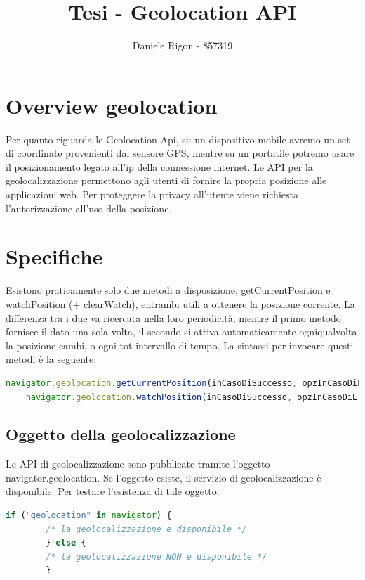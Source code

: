 \documentclass[italian]{article}
\author{
	Daniele Rigon - 857319 \\
}
\begin{document}
	
	\title{Tesi - Geolocation API}
	\maketitle
	
	\tableofcontents
	\pagebreak
	
	
	\section{Overview geolocation}
	Per quanto riguarda le Geolocation Api, su un dispositivo mobile avremo un set di coordinate provenienti dal sensore GPS, mentre su un portatile potremo usare il posizionamento legato all’ip della connessione internet.
	Le API per la geolocalizzazione permettono agli utenti di fornire la propria posizione alle applicazioni web. Per proteggere la privacy all'utente viene richiesta l'autorizzazione all'uso della posizione.
	
	\section{Specifiche}
	Esistono praticamente solo due metodi a disposizione, getCurrentPosition e watchPosition (+ clearWatch), entrambi utili a ottenere la posizione corrente. 
	La differenza tra i due va ricercata nella loro periodicità, mentre il primo metodo fornisce il dato una sola volta, il secondo si attiva automaticamente ogniqualvolta la posizione cambi, o ogni tot intervallo di tempo.
	La sintassi per invocare questi metodi è la seguente:
	\begin{lstlisting}[language=JavaScript]
	navigator.geolocation.getCurrentPosition(inCasoDiSuccesso, opzInCasoDiErrore, opzioni); 
	navigator.geolocation.watchPosition(inCasoDiSuccesso, opzInCasoDiErrore, opzioni);
	\end{lstlisting}

	\subsection{Oggetto della geolocalizzazione}
	Le API di geolocalizzazione sono pubblicate tramite l'oggetto navigator.geolocation. Se l'oggetto esiste, il servizio di geolocalizzazione è disponibile. Per testare l'esistenza di tale oggetto:
	\begin{lstlisting}[language=JavaScript]
		if ("geolocation" in navigator) {
		/* la geolocalizzazione e disponibile */
		} else {
		/* la geolocalizzazione NON e disponibile */
		}
	\end{lstlisting}
	
\end{document}
